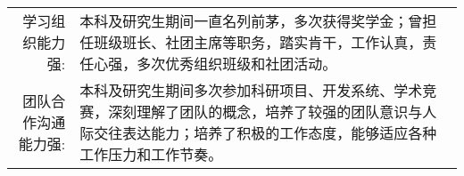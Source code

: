 %
%



\renewcommand{\arraystretch}{1.1}

	\begin{tabular}{>{}r>{}p{13cm}}

		\textsc{学习组织能力强:}
                                   &  本科及研究生期间一直名列前茅，多次获得奖学金；曾担任班级班长、社团主席等职务，踏实肯干，工作认真，责任心强，多次优秀组织班级和社团活动。 \\

		\textsc{团队合作沟通能力强:} & 本科及研究生期间多次参加科研项目、开发系统、学术竞赛，深刻理解了团队的概念，培养了较强的团队意识与人际交往表达能力；培养了积极的工作态度，能够适应各种工作压力和工作节奏。 \\

	\end{tabular}
